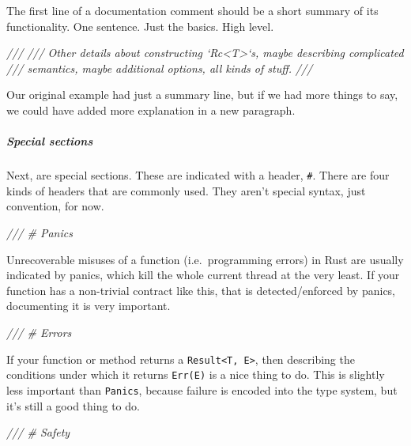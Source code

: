 \documentclass[a4paper,]{book}
\newenvironment{Shaded}{\begin{snugshade}}{\end{snugshade}}
\newcommand{\CommentTok}[1]{\textcolor[rgb]{0.56,0.35,0.01}{\textit{{#1}}}}
\let\oldsubparagraph\subparagraph
\renewcommand{\subparagraph}[1]{\oldsubparagraph{#1}\mbox{}}
\begin{document}
The first line of a documentation comment should be a short summary of
its functionality. One sentence. Just the basics. High level.

\begin{Shaded}
\begin{Highlighting}[]
\CommentTok{///}
\CommentTok{/// Other details about constructing `Rc<T>`s, maybe describing complicated}
\CommentTok{/// semantics, maybe additional options, all kinds of stuff.}
\CommentTok{///}
\end{Highlighting}
\end{Shaded}

Our original example had just a summary line, but if we had more things
to say, we could have added more explanation in a new paragraph.

\subparagraph{Special sections}\label{special-sections}

Next, are special sections. These are indicated with a header,
\texttt{\#}. There are four kinds of headers that are commonly used.
They aren't special syntax, just convention, for now.

\begin{Shaded}
\begin{Highlighting}[]
\CommentTok{/// # Panics}
\end{Highlighting}
\end{Shaded}

Unrecoverable misuses of a function (i.e.~programming errors) in Rust
are usually indicated by panics, which kill the whole current thread at
the very least. If your function has a non-trivial contract like this,
that is detected/enforced by panics, documenting it is very important.

\begin{Shaded}
\begin{Highlighting}[]
\CommentTok{/// # Errors}
\end{Highlighting}
\end{Shaded}

If your function or method returns a
\texttt{Result\textless{}T,\ E\textgreater{}}, then describing the
conditions under which it returns \texttt{Err(E)} is a nice thing to do.
This is slightly less important than \texttt{Panics}, because failure is
encoded into the type system, but it's still a good thing to do.

\begin{Shaded}
\begin{Highlighting}[]
\CommentTok{/// # Safety}
\end{Highlighting}
\end{Shaded}
\end{document}
